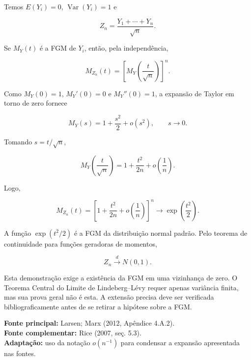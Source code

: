 \documentclass[
  letterpaper,
  DIV=11,
  numbers=noendperiod]{scrreprt}
\begin{document}
Temos \(E(Y_i)=0\), \(\operatorname{Var}(Y_i)=1\) e

\[
Z_n=\frac{Y_1+\cdots+Y_n}{\sqrt n}.
\]

Se \(M_Y(t)\) é a FGM de \(Y_i\), então, pela independência,

\[
M_{Z_n}(t)
=
\left[M_Y\left(\frac{t}{\sqrt n}\right)\right]^n.
\]

Como \(M_Y(0)=1\), \(M_Y'(0)=0\) e \(M_Y''(0)=1\), a expansão de Taylor
em torno de zero fornece

\[
M_Y(s)=1+\frac{s^2}{2}+o(s^2),
\qquad s\to 0.
\]

Tomando \(s=t/\sqrt n\),

\[
M_Y\left(\frac{t}{\sqrt n}\right)
=
1+\frac{t^2}{2n}+o\left(\frac{1}{n}\right).
\]

Logo,

\[
M_{Z_n}(t)
=
\left[
1+\frac{t^2}{2n}+o\left(\frac{1}{n}\right)
\right]^n
\longrightarrow
\exp\left(\frac{t^2}{2}\right).
\]

A função \(\exp(t^2/2)\) é a FGM da distribuição normal padrão. Pelo
teorema de continuidade para funções geradoras de momentos,

\[
Z_n\xrightarrow{d}N(0,1).
\]

\begin{tcolorbox}[enhanced jigsaw, colback=white, leftrule=.75mm, colbacktitle=quarto-callout-warning-color!10!white, breakable, titlerule=0mm, bottomtitle=1mm, title=\textcolor{quarto-callout-warning-color}{\faExclamationTriangle}\hspace{0.5em}{Condição importante}, colframe=quarto-callout-warning-color-frame, toprule=.15mm, opacityback=0, bottomrule=.15mm, opacitybacktitle=0.6, arc=.35mm, toptitle=1mm, rightrule=.15mm, coltitle=black, left=2mm]

Esta demonstração exige a existência da FGM em uma vizinhança de zero. O
Teorema Central do Limite de Lindeberg--Lévy requer apenas variância
finita, mas sua prova geral não é esta. A extensão precisa deve ser
verificada bibliograficamente antes de se retirar a hipótese sobre a
FGM.

\end{tcolorbox}

\begin{tcolorbox}[enhanced jigsaw, colback=white, leftrule=.75mm, colbacktitle=quarto-callout-note-color!10!white, breakable, titlerule=0mm, bottomtitle=1mm, title=\textcolor{quarto-callout-note-color}{\faInfo}\hspace{0.5em}{Fonte da demonstração}, colframe=quarto-callout-note-color-frame, toprule=.15mm, opacityback=0, bottomrule=.15mm, opacitybacktitle=0.6, arc=.35mm, toptitle=1mm, rightrule=.15mm, coltitle=black, left=2mm]

\textbf{Fonte principal:} Larsen; Marx (2012, Apêndice 4.A.2).\\
\textbf{Fonte complementar:} Rice (2007, seç. 5.3).\\
\textbf{Adaptação:} uso da notação \(o(n^{-1})\) para condensar a
expansão apresentada nas fontes.

\end{tcolorbox}
\end{document}

